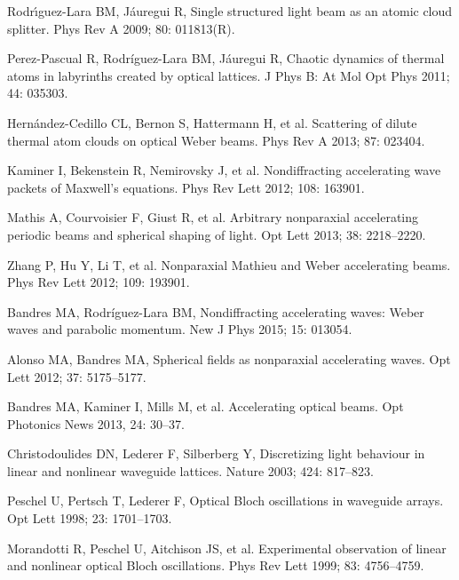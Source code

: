 \documentclass[12pt]{iopart}
\begin{document}
\begin{thebibliography}{100}
	 Rodr{\'\i}guez-Lara BM, J{\'a}uregui  R,
	Single structured light beam as an atomic cloud splitter.
	Phys Rev A 2009;  80: 011813(R).
	
	 Perez-Pascual R, Rodr{\'i}guez-Lara BM, J{\'a}uregui R,
	Chaotic dynamics of thermal atoms in labyrinths created by optical lattices.
	J Phys B: At Mol Opt Phys 2011;  44: 035303.
	
	 Hern{\'a}ndez-Cedillo CL, Bernon S, Hattermann H, et al.
	Scattering of dilute thermal atom clouds on optical Weber beams.
	Phys Rev A 2013;  87: 023404.
	
	 Kaminer I, Bekenstein R, Nemirovsky J, et al.
	Nondiffracting accelerating wave packets of Maxwell's equations.
	Phys Rev Lett 2012;  108: 163901.
	
	 Mathis A, Courvoisier F, Giust R, et al.
	Arbitrary nonparaxial accelerating periodic beams and spherical shaping of light.
	Opt Lett 2013;  38: 2218--2220.
	
	 Zhang P, Hu Y, Li T, et al.
	Nonparaxial Mathieu and Weber accelerating beams.
	Phys Rev Lett 2012;  109: 193901.
	
	 Bandres MA, Rodr{\'i}guez-Lara BM,
	Nondiffracting accelerating waves: Weber waves and parabolic momentum.
	New J Phys 2015;  15: 013054.
	
	 Alonso MA, Bandres MA,
	Spherical fields as nonparaxial accelerating waves.
	Opt Lett 2012;  37: 5175--5177.
	
	 Bandres MA, Kaminer I, Mills M,  et al.
	Accelerating optical beams.
	Opt Photonics News 2013,  24: 30--37.
	
	
	 Christodoulides DN, Lederer F, Silberberg Y,
	Discretizing light behaviour in linear and nonlinear waveguide lattices.
	Nature 2003;  424: 817--823.
	
	 Peschel U, Pertsch T, Lederer F,
	Optical Bloch oscillations in waveguide arrays.
	Opt Lett 1998;  23:  1701--1703.
	
	 Morandotti R, Peschel U, Aitchison JS, et al.
	Experimental observation of linear and nonlinear optical Bloch oscillations.
	Phys Rev Lett 1999;  83: 4756--4759.
	

\end{thebibliography}
\end{document}
